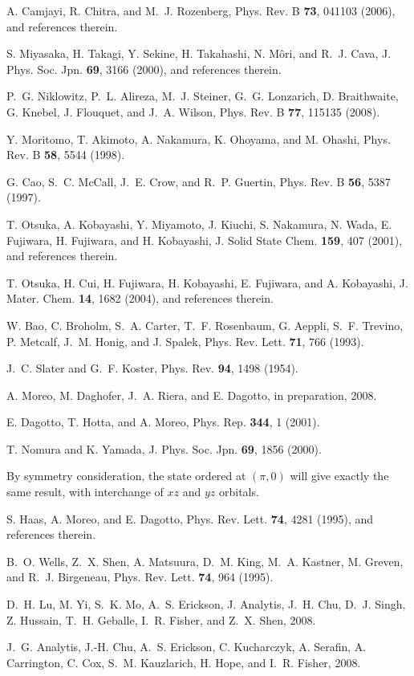 \documentclass[aps,prb,superscriptaddress,preprintnumbers,
showpacs,legalpaper,twoside,twocolumn,amsmath,amssymb]{revtex4}
\begin{document}
\begin{thebibliography}{10}
A. Camjayi, R. Chitra, and M.~J. Rozenberg, Phys. Rev. B {\bf 73},  041103
  (2006), and references therein.

S. Miyasaka, H. Takagi, Y. Sekine, H. Takahashi, N. M\^ori, and R.~J. Cava, J.
  Phys. Soc. Jpn. {\bf 69},  3166  (2000), and references therein.

P.~G. Niklowitz, P.~L. Alireza, M.~J. Steiner, G.~G. Lonzarich, D. Braithwaite,
  G. Knebel, J. Flouquet, and J.~A. Wilson, Phys. Rev. B {\bf 77},  115135
  (2008).

Y. Moritomo, T. Akimoto, A. Nakamura, K. Ohoyama, and M. Ohashi, Phys. Rev. B
  {\bf 58},  5544  (1998).

G. Cao, S.~C. McCall, J.~E. Crow, and R.~P. Guertin, Phys. Rev. B {\bf 56},
  5387  (1997).

T. Otsuka, A. Kobayashi, Y. Miyamoto, J. Kiuchi, S. Nakamura, N. Wada, E.
  Fujiwara, H. Fujiwara, and H. Kobayashi, J. Solid State Chem. {\bf 159},  407
    (2001), and references therein.

T. Otsuka, H. Cui, H. Fujiwara, H. Kobayashi, E. Fujiwara, and A. Kobayashi, J.
  Mater. Chem. {\bf 14},  1682  (2004), and references therein.

W. Bao, C. Broholm, S.~A. Carter, T.~F. Rosenbaum, G. Aeppli, S.~F. Trevino, P.
  Metcalf, J.~M. Honig, and J. Spalek, Phys. Rev. Lett. {\bf 71},  766  (1993).

J.~C. Slater and G.~F. Koster, Phys. Rev. {\bf 94},  1498  (1954).

A. Moreo, M. Daghofer, J.~A. Riera, and E. Dagotto, in preparation, 2008.

E. Dagotto, T. Hotta, and A. Moreo, Phys. Rep. {\bf 344},  1   (2001).

T. Nomura and K. Yamada, J. Phys. Soc. Jpn. {\bf 69},  1856  (2000).

By symmetry consideration, the state ordered at $(\pi,0)$ will give exactly the
  same result, with interchange of $xz$ and $yz$ orbitals.

S. Haas, A. Moreo, and E. Dagotto, Phys. Rev. Lett. {\bf 74},  4281  (1995),
  and references therein.

B.~O. Wells, Z.~X. Shen, A. Matsuura, D.~M. King, M.~A. Kastner, M. Greven, and
  R.~J. Birgeneau, Phys. Rev. Lett. {\bf 74},  964  (1995).

D.~H. Lu, M. Yi, S.~K. Mo, A.~S. Erickson, J. Analytis, J.~H. Chu, D.~J. Singh,
  Z. Hussain, T.~H. Geballe, I.~R. Fisher, and Z.~X. Shen, 2008.

J.~G. Analytis, J.-H. Chu, A.~S. Erickson, C. Kucharczyk, A. Serafin, A.
  Carrington, C. Cox, S.~M. Kauzlarich, H. Hope, and I.~R. Fisher, 2008.


\end{thebibliography}
\end{document}
